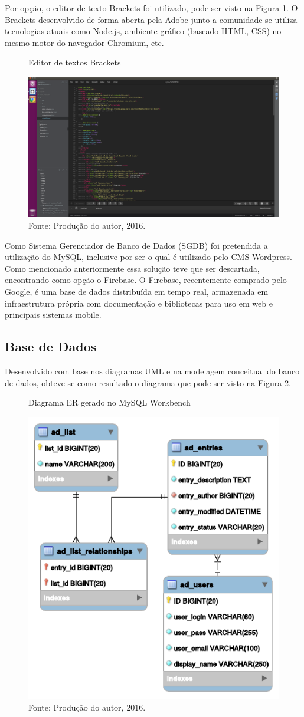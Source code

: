 \documentclass[
	12pt,
	openright,
	oneside, %
	a4paper,
	chapter=TITLE,
	section=TITLE,
	english,
	brazil %
	]{abntex2-udesc}
\begin{document}
Por opção, o editor de texto Brackets foi utilizado, pode ser visto na Figura \ref{fig:brackets}. O Brackets desenvolvido de forma aberta pela Adobe junto a comunidade se utiliza tecnologias atuais como Node.js, ambiente gráfico (baseado HTML, CSS) no mesmo motor do navegador Chromium, etc.

\begin{figure}[h]
\caption{Editor de textos Brackets}\label{fig:brackets}
\centering
\includegraphics[width=.5\textwidth,keepaspectratio]{figures/brackets.pdf}
\caption*{\footnotesize Fonte: Produção do autor, 2016.}
\end{figure}

Como Sistema Gerenciador de Banco de Dados (SGDB) foi pretendida a utilização do MySQL, inclusive por ser o qual é utilizado pelo CMS Wordpress. Como mencionado anteriormente essa solução teve que ser descartada, encontrando como opção o Firebase. O Firebase, recentemente comprado pelo Google, é uma base de dados distribuída em tempo real, armazenada em infraestrutura própria com documentação e bibliotecas para uso em web e principais sistemas mobile.

\subsection{Base de Dados}\label{subsec:mer}

Desenvolvido com base nos diagramas UML e na modelagem conceitual do banco de dados, obteve-se como resultado o diagrama que pode ser visto na Figura \ref{fig:er}.

\begin{figure}[h]
\caption{Diagrama ER gerado no MySQL Workbench}\label{fig:er}
\centering
\includegraphics[width=.4\textwidth,keepaspectratio]{figures/er.pdf}
\caption*{\footnotesize Fonte: Produção do autor, 2016.}
\end{figure}
\end{document}
